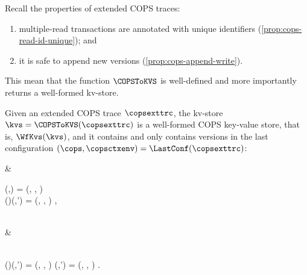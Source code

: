 

Recall the properties of extended COPS traces:
\begin{enumerate}
\item multiple-read transactions are annotated with unique identifiers (\cref{prop:cops-read-id-unique});
and \item it is safe to append new versions (\cref{prop:cops-append-write}).
\end{enumerate}
This mean that the function \( \COPSToKVS \) is well-defined and more importantly 
returns a well-formed kv-store.

\begin{proposition}
Given an extended COPS trace \( \copsexttrc \),
the kv-store \( \kvs = \COPSToKVS(\copsexttrc) \) is a well-formed COPS key-value store,
that is, \( \WfKvs(\kvs) \),
and it contains and only contains versions 
in the last configuration \( (\cops,\copsctxenv) = \LastConf(\copsexttrc) \):
\begin{Formulae}
& \begin{Formula}
    \Forall{\key \in \Keys | \idx \in \Indexs | \val \in \Values | \copstxid \in \COPSTxIDs }
    \kvs(\key,\idx) = (\val, \copstxid, \stub )
    \\ \implies 
    \cops(\repl)(\key,\idx') = (\val, \copstxid, \stub ) ,
    \label{equ:versions-in-merged-cops-to-replicas}
\end{Formula}
\\ & \begin{Formula}
    \Forall{\key \in \Keys | \idx \in \Indexs | \val \in \Values | \copstxid \in \COPSTxIDs }
    \\ \Forall{ \repl \in \COPSReplicas}
    \cops(\repl)(\key,\idx') = (\val, \copstxid, \stub ) 
    \implies 
    \kvs(\key,\idx') = (\val, \copstxid, \stub ) .
    \label{equ:versions-in-replicas-to-merged-cops}
\end{Formula}
\end{Formulae}
\end{proposition}
